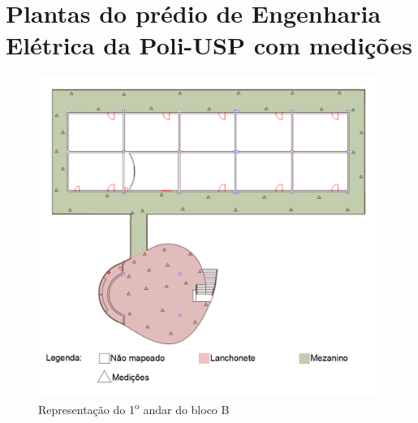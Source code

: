 \chapter{Plantas do prédio de Engenharia Elétrica da Poli-USP com medições}
\label{anexoMapa}

\begin{figure}[H]
  \centering
  \begin{minipage}[b]{1\textwidth}
    \includegraphics[width=\textwidth]{imagens/2andar.png}
    \caption{Representação do 1\textsuperscript{o} andar do bloco B}
  \end{minipage}
  
\end{figure}


